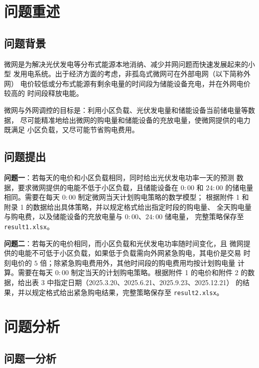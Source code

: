 \documentclass[withoutpreface,bwprint]{cumcmthesis}
\begin{document}
\section{问题重述}

\subsection{问题背景}

微网是为解决光伏发电等分布式能源本地消纳、减少并网问题而快速发展起来的小型
发用电系统。出于经济方面的考虑，非孤岛式微网可在外部电网（以下简称外网）
电价较低或分布式能源有剩余电量的时间段为储能设备充电，并在外网电价较高的
时间段释放电能。

微网与外网调控的目标是：利用小区负载、光伏发电量和储能设备当前储电量等数据，
尽可能精准地给出微网的购电量和储能设备的充放电量，使微网提供的电力既满足
小区负载，又尽可能节省购电费用。

\subsection{问题提出}

\textbf{问题一}：若每天的电价和小区负载相同，同时给出光伏发电功率一天的预测
数据，要求微网提供的电能不低于小区负载，且储能设备在 $0{:}00$ 和 $24{:}00$
的储电量相同。需要在每天 $0{:}00$ 制定微网当天计划购电策略的数学模型；
根据附件 1 和附录 1 的数据给出具体策略，并以规定格式给出指定时段的购电量、
全天购电量与购电费，以及储能设备的充放电量与 $0{:}00$、$24{:}00$ 储电量，
完整策略保存至 \texttt{result1.xlsx}。

\textbf{问题二}：若每天的电价相同，而小区负载和光伏发电功率随时间变化，且
微网提供的电能不可低于小区负载，如果低于负载需向外网紧急购电，其电价是交易
时刻电价的 $5$ 倍；除紧急购电费用外，其他时间段的购电费用均按计划购电量
计算。需要在每天 $0{:}00$ 制定当天的计划购电策略。根据附件 1 的电价和附件 2
的数据，给出表 3 中指定日期（2025.3.20、2025.6.21、2025.9.23、2025.12.21）
的结果，并以规定格式给出紧急购电结果，完整策略保存至 \texttt{result2.xlsx}。

\section{问题分析}

\subsection{问题一分析}
\end{document}
